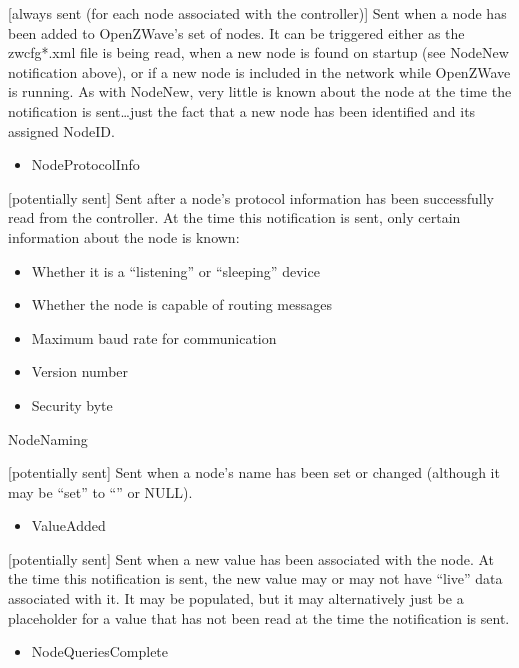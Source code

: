 \documentclass[letterpaper,10pt,english]{sphinxmanual}
\begin{document}
\begin{fulllineitems}
\begin{itemize}
\end{itemize}

{[}always sent (for each node associated with the controller){]}
Sent when a node has been added to OpenZWave’s set of nodes.  It can be
triggered either as the zwcfg*.xml file is being read, when a new node
is found on startup (see NodeNew notification above), or if a new node
is included in the network while OpenZWave is running.
As with NodeNew, very little is known about the node at the time the
notification is sent…just the fact that a new node has been identified
and its assigned NodeID.
\begin{itemize}
\item {} 
NodeProtocolInfo

\end{itemize}

{[}potentially sent{]}  Sent after a node’s protocol information has been
successfully read from the controller.
At the time this notification is sent, only certain information about the node is known:
\begin{itemize}
\item {} 
Whether it is a “listening” or “sleeping” device

\item {} 
Whether the node is capable of routing messages

\item {} 
Maximum baud rate for communication

\item {} 
Version number

\item {} 
Security byte

\end{itemize}

NodeNaming

{[}potentially sent{]}  Sent when a node’s name has been set or changed
(although it may be “set” to “” or NULL).
\begin{itemize}
\item {} 
ValueAdded

\end{itemize}

{[}potentially sent{]}  Sent when a new value has been associated with the node.
At the time this notification is sent, the new value may or may not
have “live” data associated with it. It may be populated, but it may
alternatively just be a placeholder for a value that has not been read
at the time the notification is sent.
\begin{itemize}
\item {} 
NodeQueriesComplete


\end{itemize}
\end{fulllineitems}
\end{document}
